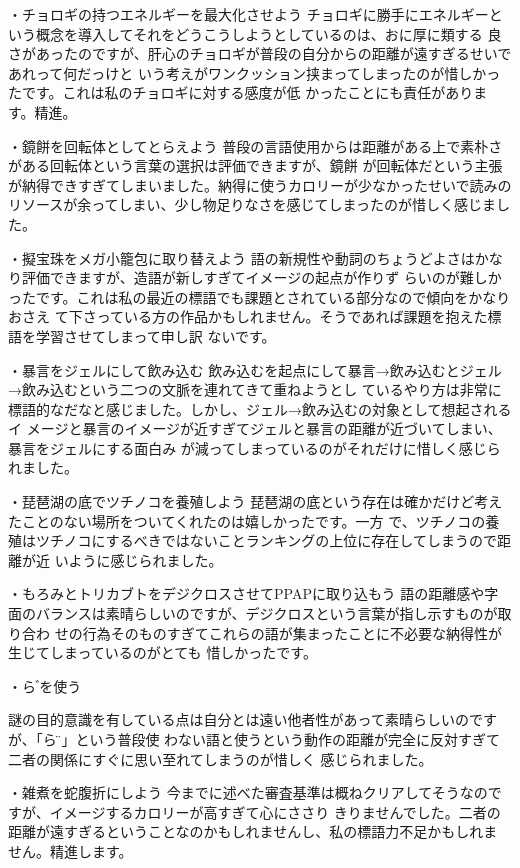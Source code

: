 ・チョロギの持つエネルギーを最大化させよう
チョロギに勝手にエネルギーという概念を導入してそれをどうこうしようとしているのは、おに厚に類する
良さがあったのですが、肝心のチョロギが普段の自分からの距離が遠すぎるせいであれって何だっけと
いう考えがワンクッション挟まってしまったのが惜しかったです。これは私のチョロギに対する感度が低
かったことにも責任があります。精進。

・鏡餅を回転体としてとらえよう
普段の言語使用からは距離がある上で素朴さがある回転体という言葉の選択は評価できますが、鏡餅
が回転体だという主張が納得できすぎてしまいました。納得に使うカロリーが少なかったせいで読みの
リソースが余ってしまい、少し物足りなさを感じてしまったのが惜しく感じました。

・擬宝珠をメガ小籠包に取り替えよう
語の新規性や動詞のちょうどよさはかなり評価できますが、造語が新しすぎてイメージの起点が作りず
らいのが難しかったです。これは私の最近の標語でも課題とされている部分なので傾向をかなりおさえ
て下さっている方の作品かもしれません。そうであれば課題を抱えた標語を学習させてしまって申し訳
ないです。

・暴言をジェルにして飲み込む
飲み込むを起点にして暴言→飲み込むとジェル→飲み込むという二つの文脈を連れてきて重ねようとし
ているやり方は非常に標語的なだなと感じました。しかし、ジェル→飲み込むの対象として想起されるイ
メージと暴言のイメージが近すぎてジェルと暴言の距離が近づいてしまい、暴言をジェルにする面白み
が減ってしまっているのがそれだけに惜しく感じられました。

・琵琶湖の底でツチノコを養殖しよう
琵琶湖の底という存在は確かだけど考えたことのない場所をついてくれたのは嬉しかったです。一方
で、ツチノコの養殖はツチノコにするべきではないことランキングの上位に存在してしまうので距離が近
いように感じられました。

・もろみとトリカブトをデジクロスさせてPPAPに取り込もう
語の距離感や字面のバランスは素晴らしいのですが、デジクロスという言葉が指し示すものが取り合わ
せの行為そのものすぎてこれらの語が集まったことに不必要な納得性が生じてしまっているのがとても
惜しかったです。

・ら ゙を使う

謎の目的意識を有している点は自分とは遠い他者性があって素晴らしいのですが、「ら ̈」という普段使
わない語と使うという動作の距離が完全に反対すぎて二者の関係にすぐに思い至れてしまうのが惜しく
感じられました。

・雑煮を蛇腹折にしよう
今までに述べた審査基準は概ねクリアしてそうなのですが、イメージするカロリーが高すぎて心にささり
きりませんでした。二者の距離が遠すぎるということなのかもしれませんし、私の標語力不足かもしれま
せん。精進します。

